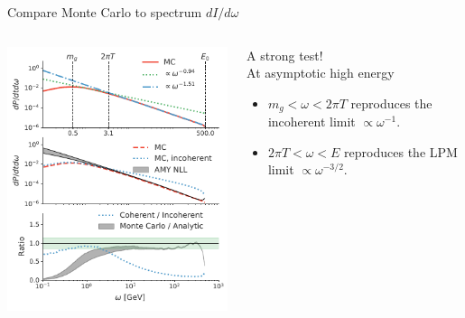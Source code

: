 \documentclass[11pt]{beamer}
\begin{document}
\begin{frame}{Compare Monte Carlo to spectrum $dI/d\omega$}
\begin{columns}
\begin{column}{.5\textwidth}
\begin{center}
\includegraphics[width=\textwidth]{spectrum.pdf}
\end{center}
\end{column}
\begin{column}{.5\textwidth}
A strong test!\\
At asymptotic high energy
\begin{itemize}
\item $m_g<\omega<2\pi T$ reproduces the incoherent limit $\propto\omega^{-1}$.
\item $2\pi T<\omega<E$ reproduces the LPM limit $\propto\omega^{-3/2}$.
\end{itemize}
\end{column}
\end{columns}
\end{frame}
\end{document}
